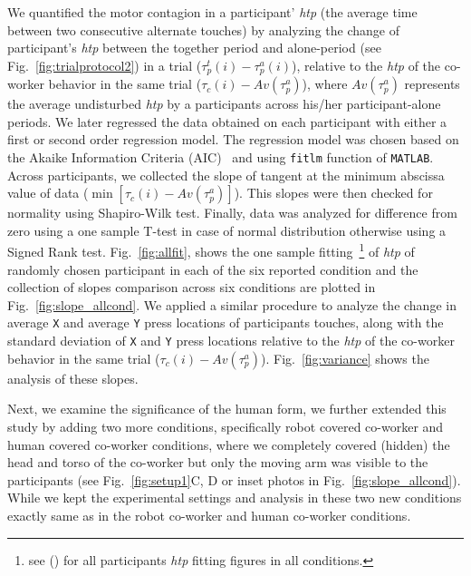 We quantified the motor contagion in a participant' {\it htp} (the average time between two consecutive alternate touches) by analyzing the change of participant's {\it htp} between the together period and alone-period (see Fig.~\ref{fig:trialprotocol2}) in a trial ($\tau_p^t(i)-\tau_p^a(i)$), relative to the {\it htp} of the co-worker behavior in the same trial ($\tau_c (i)-Av(\tau_p^a)$), where $Av(\tau_p^a)$ represents the average undisturbed {\it htp} by a participants across his/her participant-alone periods. We later regressed the data obtained on each participant with either a first or second order regression model. The regression model was chosen based on the Akaike Information Criteria (AIC)~\cite{Akaike:ISIT:1973} and using {\tt fitlm} function of \texttt{MATLAB}. Across participants, we collected the slope of tangent at the minimum abscissa value of data ($\min[\tau_c(i)-Av(\tau_p^a)]$). This slopes were then checked for normality using Shapiro-Wilk test. Finally, data was analyzed for difference from zero using a one sample T-test in case of normal distribution otherwise using a Signed Rank test. Fig.~\ref{fig:allfit}, shows the one sample fitting~\footnote{see () for all participants \textit{htp} fitting figures in all conditions.} of \textit{htp} of randomly chosen participant in each of the six reported condition and the collection of slopes comparison across six conditions are plotted in Fig.~\ref{fig:slope_allcond}. We applied a similar procedure to analyze the change in average \texttt{X} and average \texttt{Y} press locations of participants touches, along with the standard deviation of \texttt{X} and \texttt{Y} press locations relative to the {\it htp} of the co-worker behavior in the same trial ($\tau_c(i)-Av(\tau_p^a)$). Fig.~\ref{fig:variance} shows the analysis of these slopes.

Next, we examine the significance of the human form, we further extended this study by adding two more conditions, specifically robot covered co-worker and human covered co-worker conditions, where we completely covered (hidden) the head and torso of the co-worker but only the moving arm was visible to the participants (see Fig.~\ref{fig:setup1}C, D or inset photos in Fig.~\ref{fig:slope_allcond}). While we kept the experimental settings and analysis in these two new conditions exactly same as in the robot co-worker and human co-worker conditions.


